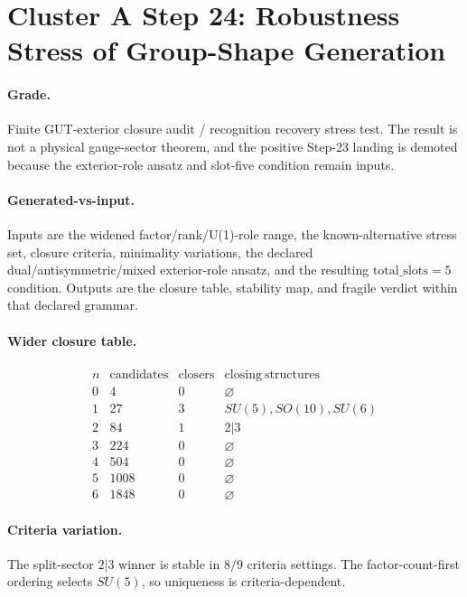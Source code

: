 \section*{Cluster A Step 24: Robustness Stress of Group-Shape Generation}

\paragraph{Grade.}
Finite GUT-exterior closure audit / recognition recovery stress test. The result is not a physical gauge-sector theorem, and the positive Step-23 landing is demoted because the exterior-role ansatz and slot-five condition remain inputs.

\paragraph{Generated-vs-input.}
Inputs are the widened factor/rank/U(1)-role range, the known-alternative stress set, closure criteria, minimality variations, the declared dual/antisymmetric/mixed exterior-role ansatz, and the resulting \( \mathrm{total\_slots}=5 \) condition. Outputs are the closure table, stability map, and fragile verdict within that declared grammar.

\paragraph{Wider closure table.}
\[
\begin{array}{c|ccc}
n & \mathrm{candidates} & \mathrm{closers} & \mathrm{closing\ structures}\\
\hline
0 & 4 & 0 & \varnothing\\
1 & 27 & 3 & SU(5),SO(10),SU(6)\\
2 & 84 & 1 & 2|3\\
3 & 224 & 0 & \varnothing\\
4 & 504 & 0 & \varnothing\\
5 & 1008 & 0 & \varnothing\\
6 & 1848 & 0 & \varnothing
\end{array}
\]

\paragraph{Criteria variation.}
The split-sector \(2|3\) winner is stable in \(8/9\) criteria settings. The factor-count-first ordering selects \(SU(5)\), so uniqueness is criteria-dependent.

